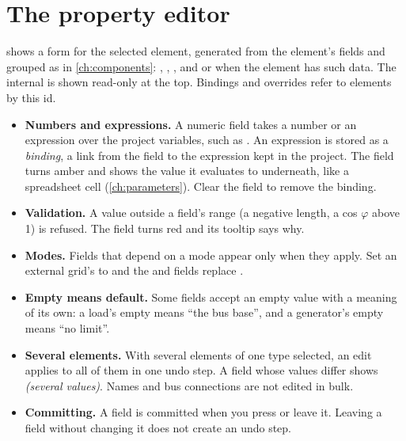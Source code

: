 \section{The property editor}\label{sec:properties}

\begin{minipage}[t]{0.55\linewidth}
 shows a form for the selected element, generated from the element's
fields and grouped as in \cref{ch:components}: , ,
, and  or  when the element has such
data. The internal  is shown read-only at the top. Bindings and overrides refer
to elements by this id.

\begin{itemize}
  \item \textbf{Numbers and expressions.} A numeric field takes a number or an expression
    over the project variables, such as . An expression is stored as a
    \emph{binding}, a link from the field to the expression kept in the project. The field
    turns amber and shows the value it evaluates to underneath, like a spreadsheet cell
    (\cref{ch:parameters}). Clear the field to remove the binding.
  \item \textbf{Validation.} A value outside a field's range (a negative length, a cos
    $\varphi$ above 1) is refused. The field turns red and its tooltip says why.
  \item \textbf{Modes.} Fields that depend on a mode appear only when they apply. Set an
    external grid's  to  and the  and 
    fields replace .
  \item \textbf{Empty means default.} Some fields accept an empty value with a meaning of
    its own: a load's  empty means ``the bus base'', and a generator's
     empty means ``no limit''.
  \item \textbf{Several elements.} With several elements of one type selected, an edit
    applies to all of them in one undo step. A field whose values differ shows
    \emph{(several values)}. Names and bus connections are not edited in bulk.
  \item \textbf{Committing.} A field is committed when you press  or leave it.
    Leaving a field without changing it does not create an undo step.
\end{itemize}
\end{minipage}\hfill
\begin{minipage}[t]{0.4\linewidth}\vspace{0pt}
  \centering{}
\end{minipage}


